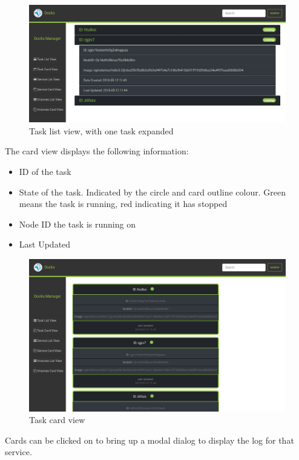 \documentclass[]{article}
\providecommand{\tightlist}{%
	\setlength{\itemsep}{0pt}\setlength{\parskip}{0pt}}
\begin{document}
\begin{figure}[H]
	\centering
	\includegraphics[scale=0.4]{task_list.png}
	\caption{Task list view, with one task expanded}
\end{figure}

The card view displays the following information:
\begin{itemize}
	\tightlist
	\item ID of the task
	\item State of the task. Indicated by the circle and card outline colour. Green means the task is running, red indicating it has stopped
	\item Node ID the task is running on
	\item Last Updated
\end{itemize}

\begin{figure}[H]
	\centering
	\includegraphics[scale=0.4]{task_card_view.png}
	\caption{Task card view}
\end{figure}

Cards can be clicked on to bring up a modal dialog to display the log for that service.
\end{document}
